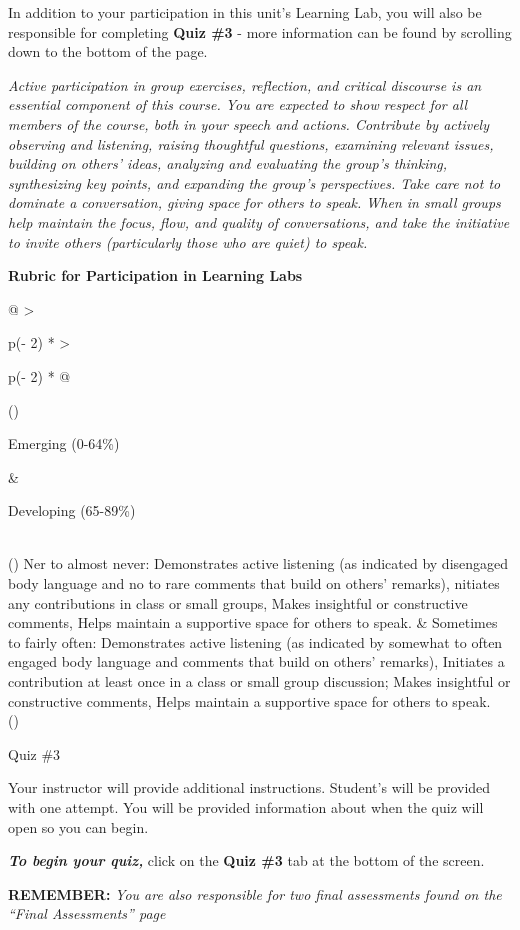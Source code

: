 \documentclass[
]{book}
\begin{document}
\begin{assessment}
In addition to your participation in this unit's Learning Lab, you will also be responsible for completing \textbf{Quiz \#3} - more information can be found by scrolling down to the bottom of the page.

\emph{Active participation in group exercises, reflection, and critical discourse is an essential component of this course. You are expected to show respect for all members of the course, both in your speech and actions. Contribute by actively observing and listening, raising thoughtful questions, examining relevant issues, building on others' ideas, analyzing and evaluating the group's thinking, synthesizing key points, and expanding the group's perspectives. Take care not to dominate a conversation, giving space for others to speak. When in small groups help maintain the focus, flow, and quality of conversations, and take the initiative to invite others (particularly those who are quiet) to speak.}

\textbf{Rubric for Participation in Learning Labs}

\begin{longtable}[]{@{}
  >{\raggedright\arraybackslash}p{(\columnwidth - 2\tabcolsep) * }
  >{\raggedright\arraybackslash}p{(\columnwidth - 2\tabcolsep) * }@{}}
\toprule()
\begin{minipage}[b]{\linewidth}\raggedright
Emerging (0-64\%)
\end{minipage} & \begin{minipage}[b]{\linewidth}\raggedright
Developing (65-89\%)
\end{minipage} \\
\midrule()
\endhead
Ner to almost never: Demonstrates active listening (as indicated by disengaged body language and no to rare comments that build on others' remarks), nitiates any contributions in class or small groups, Makes insightful or constructive comments, Helps maintain a supportive space for others to speak. & Sometimes to fairly often: Demonstrates active listening (as indicated by somewhat to often engaged body language and comments that build on others' remarks), Initiates a contribution at least once in a class or small group discussion; Makes insightful or constructive comments, Helps maintain a supportive space for others to speak. \\
\bottomrule()
\end{longtable}

{Quiz \#3}

Your instructor will provide additional instructions. Student's will be provided with one attempt. You will be provided information about when the quiz will open so you can begin.

\textbf{\emph{To begin your quiz,}} click on the \textbf{Quiz \#3} tab at the bottom of the screen.

\textbf{REMEMBER:} \emph{You are also responsible for two final assessments found on the ``Final Assessments'' page}
\end{assessment}
\end{document}
